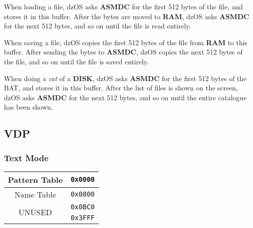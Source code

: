         When loading a file, dzOS asks \textbf{ASMDC} for the first 512 bytes of the
        file, and stores it in this buffer. After the bytes are moved to
        \textbf{RAM}, dzOS asks \textbf{ASMDC} for the next 512 bytes, and so on
        until the file is read entirely.

        When saving a file, dzOS copies the first 512 bytes of the file from
        \textbf{RAM} to this buffer. After sending the bytes to \textbf{ASMDC}, dzOS
        copies the next 512 bytes of the file, and so on until the file is saved
        entirely.

        When doing a \textit{cat} of a \textbf{DISK}, dzOS asks \textbf{ASMDC} for
        the first 512 bytes of the BAT, and stores it in this buffer. After the list
        of files is shown on the screen, dzOS asks \textbf{ASMDC} for the next 512
        bytes, and so on until the entire catalogue has been shown.

    \subsection{VDP}
    \label{subsec:vdp_memmap}

        \subsubsection{Text Mode}
        \begin{center}
            \begin{tabular}{c r}
                \hline
                Pattern Table           & \texttt{0x0000}\\
                \hline
                Name Table              & \texttt{0x0800}\\
                \hline
                \multirow{2}{*}{UNUSED} & \texttt{0x0BC0}\\
                                        & \texttt{0x3FFF}\\
                \hline
            \end{tabular}
        \end{center}

